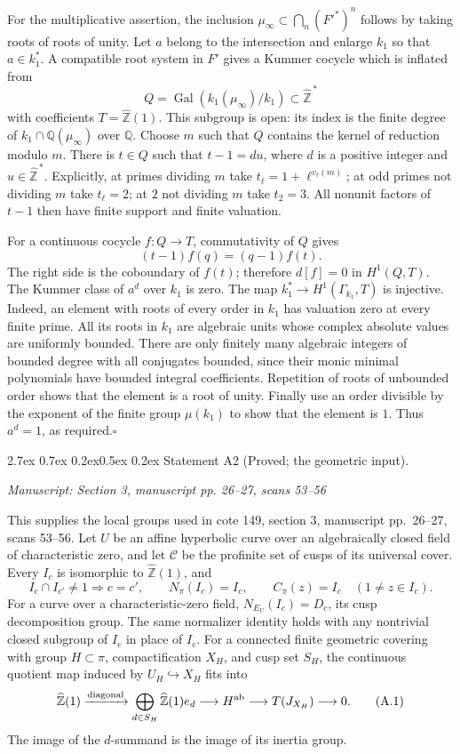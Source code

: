 \documentclass[11pt,a4paper]{article}
\makeatletter
\newcommand{\passage}[1]{\par\smallskip\noindent\textit{Manuscript: #1}\par\smallskip}
\renewcommand\paragraph{\@startsection{paragraph}{4}{\z@}%
  {2.7ex \@plus 0.7ex \@minus 0.2ex}{0.5ex \@plus 0.2ex}%
  {\normalfont\normalsize\bfseries}}
\makeatother
\begin{document}
For the multiplicative assertion, the inclusion $\mu_\infty\subset\bigcap_n(F'^*)^n$ follows by taking roots of roots of unity. Let $a$ belong to the intersection and enlarge $k_1$ so that $a\in k_1^*$. A compatible root system in $F'$ gives a Kummer cocycle which is inflated from
\[
 Q=\operatorname{Gal}(k_1(\mu_\infty)/k_1)
 \subset\widehat{\mathbb Z}^{\,*}
\]
with coefficients $T=\widehat{\mathbb Z}(1)$. This subgroup is open: its index is the finite degree of $k_1\cap\mathbb Q(\mu_\infty)$ over $\mathbb Q$. Choose $m$ such that $Q$ contains the kernel of reduction modulo $m$. There is $t\in Q$ such that $t-1=du$, where $d$ is a positive integer and $u\in\widehat{\mathbb Z}^{\,*}$. Explicitly, at primes dividing $m$ take $t_\ell=1+\ell^{v_\ell(m)}$; at odd primes not dividing $m$ take $t_\ell=2$; at $2$ not dividing $m$ take $t_2=3$. All nonunit factors of $t-1$ then have finite support and finite valuation.

For a continuous cocycle $f:Q\to T$, commutativity of $Q$ gives
\[
 (t-1)f(q)=(q-1)f(t).
\]
The right side is the coboundary of $f(t)$; therefore $d[f]=0$ in $H^1(Q,T)$. The Kummer class of $a^d$ over $k_1$ is zero. The map $k_1^*\to H^1(\Gamma_{k_1},T)$ is injective. Indeed, an element with roots of every order in $k_1$ has valuation zero at every finite prime. All its roots in $k_1$ are algebraic units whose complex absolute values are uniformly bounded. There are only finitely many algebraic integers of bounded degree with all conjugates bounded, since their monic minimal polynomials have bounded integral coefficients. Repetition of roots of unbounded order shows that the element is a root of unity. Finally use an order divisible by the exponent of the finite group $\mu(k_1)$ to show that the element is $1$. Thus $a^d=1$, as required.\hfill$\square$

\paragraph{Statement A2 (Proved; the geometric input).}\label{res:A2}
\passage{Section 3, manuscript pp. 26–27, scans 53–56}

This supplies the local groups used in cote 149, section 3, manuscript pp.~26--27, scans 53--56.
Let $U$ be an affine hyperbolic curve over an algebraically closed field of characteristic zero, and let $\mathcal C$ be the profinite set of cusps of its universal cover. Every $I_c$ is isomorphic to $\widehat{\mathbb Z}(1)$, and
\[
 I_c\cap I_{c'}\ne1\Longrightarrow c=c',\qquad
 N_\pi(I_c)=I_c,\qquad C_\pi(z)=I_c\quad(1\ne z\in I_c).
\]
For a curve over a characteristic-zero field, $N_{E_U}(I_c)=D_c$, its cusp decomposition group. The same normalizer identity holds with any nontrivial closed subgroup of $I_c$ in place of $I_c$. For a connected finite geometric covering with group $H\subset\pi$, compactification $X_H$, and cusp set $S_H$, the continuous quotient map induced by $U_H\hookrightarrow X_H$ fits into
\[
 \widehat{\mathbb Z}(1)\xrightarrow{\rm diagonal}
 \bigoplus_{d\in S_H}\widehat{\mathbb Z}(1)e_d
 \longrightarrow H^{\rm ab}\longrightarrow T(J_{X_H})\longrightarrow0.\tag{A.1}
\]
The image of the $d$-summand is the image of its inertia group.
\end{document}
